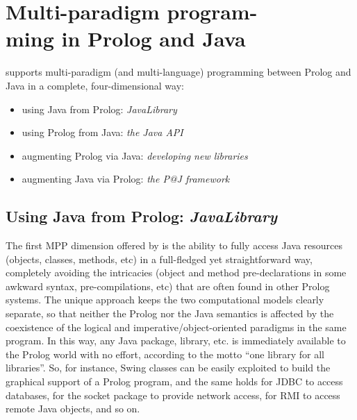 \chapter[Multi-paradigm programming in Prolog and Java]{Multi-paradigm program-\\ming in Prolog and Java}
\label{ch:mpp-in-java}

\tuprolog{} supports multi-paradigm (and multi-language) programming between Prolog and Java in a complete, four-dimensional way:

\begin{itemize}
  \item using Java from Prolog: \textit{JavaLibrary}
  \item using Prolog from Java: \textit{the Java API}
  \item augmenting Prolog via Java: \textit{developing new libraries}
  \item augmenting Java via Prolog: \textit{the P@J framework}
\end{itemize}

\section{Using Java from Prolog: \textit{JavaLibrary}}
\label{sec:java-library}
The first MPP dimension offered by \tuprolog{} is the ability to fully access Java resources (objects, classes, methods, etc) in a full-fledged yet straightforward way, completely avoiding the intricacies (object and method pre-declarations in some awkward syntax, pre-compilations, etc) that are often found in other Prolog systems.
%
The unique \tuprolog{} approach keeps the two computational models clearly separate, so that neither the Prolog nor the Java semantics is affected by the coexistence of the logical and imperative/object-oriented paradigms in the same program.
%
In this way, any Java package, library, etc. is immediately available to the Prolog world with no effort, according to the motto {``one library for all libraries''}. So, for instance, Swing classes can be easily exploited to build the graphical support of a Prolog program, and the same holds for JDBC to access databases, for the socket package to provide network access, for RMI to access remote Java objects, and so on.

